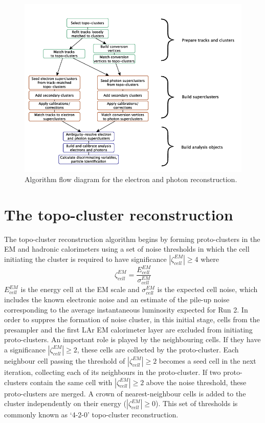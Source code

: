 \documentclass[a4paper, oneside, 11pt, openright]{book}
\begin{document}
		\begin{figure}
			\centering
			\includegraphics[width=.9\linewidth]{tesi_images/alg_flow.png} 
			\caption{Algorithm flow diagram for the electron and photon reconstruction.} 
			\label{fig:alg_flow}
		\end{figure}
		
		\section{The topo-cluster reconstruction}\label{section:Topo}
			The topo-cluster reconstruction algorithm begins by forming proto-clusters in the EM and hadronic calorimeters using a set of noise thresholds in which the cell initiating the cluster is required to have significance $|\zeta_{cell}^{EM}| \geq 4$ where 
			$$
			\zeta_{cell}^{EM} = \frac{E_{cell}^{EM}}{\sigma_{cell}^{EM}}
			$$		
			$E_{cell}^{EM}$ is the energy cell at the EM scale and $\sigma_{cell}^{EM}$ is the expected cell noise, which includes the known electronic noise and an estimate of the pile-up noise corresponding
			to the average instantaneous luminosity expected for Run 2. In order to suppres the formation of noise cluster, in this initial stage, cells from the presampler and the first LAr EM calorimeter layer are excluded from initiating proto-clusters.
			An important role is played by the neighbouring cells. If they have a significance $|\zeta_{cell}^{EM}| \geq 2$, these cells are collected by the proto-cluster. Each neighbour cell passing the threshold of $|\zeta_{cell}^{EM}| \geq 2$ becomes a seed cell in the next iteration, collecting each of its neighbours in the proto-cluster. If two proto-clusters contain the same cell with $|\zeta_{cell}^{EM}| \geq 2$ above the noise threshold, these proto-clusters are merged. A crown of nearest-neighbour cells is added to the cluster independently on their energy ($|\zeta_{cell}^{EM}| \geq 0$). This set of thresholds is commonly known as ‘4-2-0’ topo-cluster reconstruction.
			
\end{document}
